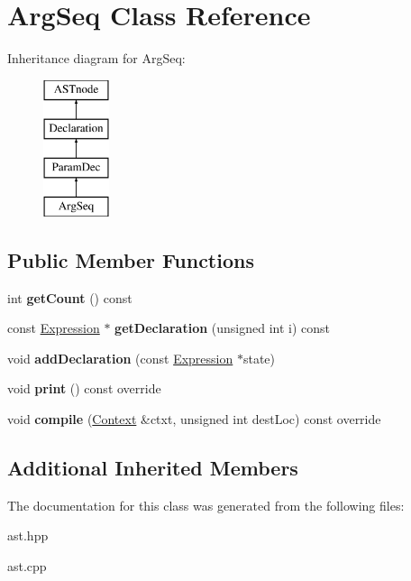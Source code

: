 \hypertarget{class_arg_seq}{}\section{Arg\+Seq Class Reference}
\label{class_arg_seq}
Inheritance diagram for Arg\+Seq\+:\begin{figure}[H]
\begin{center}
\leavevmode
\includegraphics[height=4.000000cm]{class_arg_seq}
\end{center}
\end{figure}
\subsection*{Public Member Functions}
\begin{DoxyCompactItemize}
\item 
\mbox{\label{class_arg_seq_af3b662b2cd160ce75f31e1eca76d26da}} 
int {\bfseries get\+Count} () const
\item 
\mbox{\label{class_arg_seq_a3e67a509d46faf71ff827ed1b866ce85}} 
const \hyperlink{class_expression}{Expression} $\ast$ {\bfseries get\+Declaration} (unsigned int i) const
\item 
\mbox{\label{class_arg_seq_a545dc1da22718b659fae03bd69c7dbe8}} 
void {\bfseries add\+Declaration} (const \hyperlink{class_expression}{Expression} $\ast$state)
\item 
\mbox{\label{class_arg_seq_a379b539bc6e8ca25a82308418a135318}} 
void {\bfseries print} () const override
\item 
\mbox{\label{class_arg_seq_aa6124b849889c371a03436601208d03d}} 
void {\bfseries compile} (\hyperlink{class_context}{Context} \&ctxt, unsigned int dest\+Loc) const override
\end{DoxyCompactItemize}
\subsection*{Additional Inherited Members}


The documentation for this class was generated from the following files\+:\begin{DoxyCompactItemize}
\item 
ast.\+hpp\item 
ast.\+cpp\end{DoxyCompactItemize}
